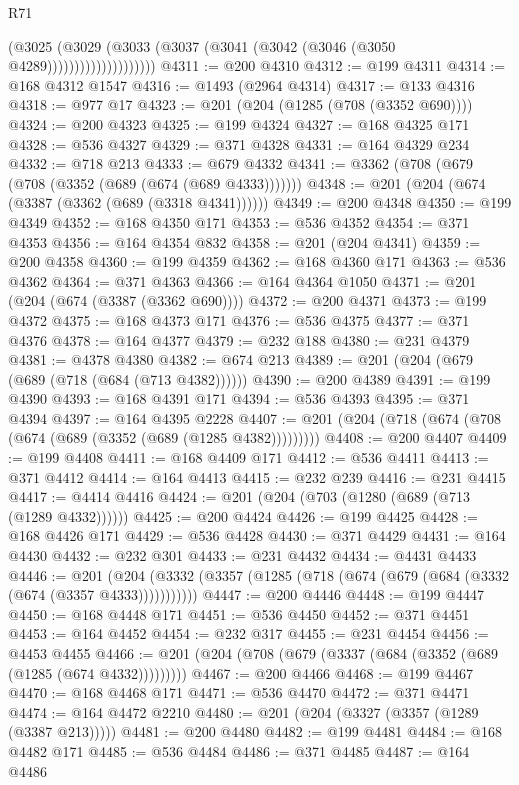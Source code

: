 \begin{lexlean}{R71}
\begin{coremodule}
                            (@3025
                              (@3029
                                (@3033 (@3037 (@3041 (@3042 (@3046 (@3050 @4289))))))))))))))))))))
@4311 := @200 @4310
@4312 := @199 @4311
@4314 := @168 @4312 @1547
@4316 := @1493 (@2964 @4314)
@4317 := @133 @4316
@4318 := @977 @17
@4323 := @201 (@204 (@1285 (@708 (@3352 @690))))
@4324 := @200 @4323
@4325 := @199 @4324
@4327 := @168 @4325 @171
@4328 := @536 @4327
@4329 := @371 @4328
@4331 := @164 @4329 @234
@4332 := @718 @213
@4333 := @679 @4332
@4341 := @3362 (@708 (@679 (@708 (@3352 (@689 (@674 (@689 @4333)))))))
@4348 := @201 (@204 (@674 (@3387 (@3362 (@689 (@3318 @4341))))))
@4349 := @200 @4348
@4350 := @199 @4349
@4352 := @168 @4350 @171
@4353 := @536 @4352
@4354 := @371 @4353
@4356 := @164 @4354 @832
@4358 := @201 (@204 @4341)
@4359 := @200 @4358
@4360 := @199 @4359
@4362 := @168 @4360 @171
@4363 := @536 @4362
@4364 := @371 @4363
@4366 := @164 @4364 @1050
@4371 := @201 (@204 (@674 (@3387 (@3362 @690))))
@4372 := @200 @4371
@4373 := @199 @4372
@4375 := @168 @4373 @171
@4376 := @536 @4375
@4377 := @371 @4376
@4378 := @164 @4377
@4379 := @232 @188
@4380 := @231 @4379
@4381 := @4378 @4380
@4382 := @674 @213
@4389 := @201 (@204 (@679 (@689 (@718 (@684 (@713 @4382))))))
@4390 := @200 @4389
@4391 := @199 @4390
@4393 := @168 @4391 @171
@4394 := @536 @4393
@4395 := @371 @4394
@4397 := @164 @4395 @2228
@4407 := @201 (@204 (@718 (@674 (@708 (@674 (@689 (@3352 (@689 (@1285 @4382)))))))))
@4408 := @200 @4407
@4409 := @199 @4408
@4411 := @168 @4409 @171
@4412 := @536 @4411
@4413 := @371 @4412
@4414 := @164 @4413
@4415 := @232 @239
@4416 := @231 @4415
@4417 := @4414 @4416
@4424 := @201 (@204 (@703 (@1280 (@689 (@713 (@1289 @4332))))))
@4425 := @200 @4424
@4426 := @199 @4425
@4428 := @168 @4426 @171
@4429 := @536 @4428
@4430 := @371 @4429
@4431 := @164 @4430
@4432 := @232 @301
@4433 := @231 @4432
@4434 := @4431 @4433
@4446 := @201
    (@204 (@3332 (@3357 (@1285 (@718 (@674 (@679 (@684 (@3332 (@674 (@3357 @4333)))))))))))
@4447 := @200 @4446
@4448 := @199 @4447
@4450 := @168 @4448 @171
@4451 := @536 @4450
@4452 := @371 @4451
@4453 := @164 @4452
@4454 := @232 @317
@4455 := @231 @4454
@4456 := @4453 @4455
@4466 := @201 (@204 (@708 (@679 (@3337 (@684 (@3352 (@689 (@1285 (@674 @4332)))))))))
@4467 := @200 @4466
@4468 := @199 @4467
@4470 := @168 @4468 @171
@4471 := @536 @4470
@4472 := @371 @4471
@4474 := @164 @4472 @2210
@4480 := @201 (@204 (@3327 (@3357 (@1289 (@3387 @213)))))
@4481 := @200 @4480
@4482 := @199 @4481
@4484 := @168 @4482 @171
@4485 := @536 @4484
@4486 := @371 @4485
@4487 := @164 @4486

\end{coremodule}
\end{lexlean}
